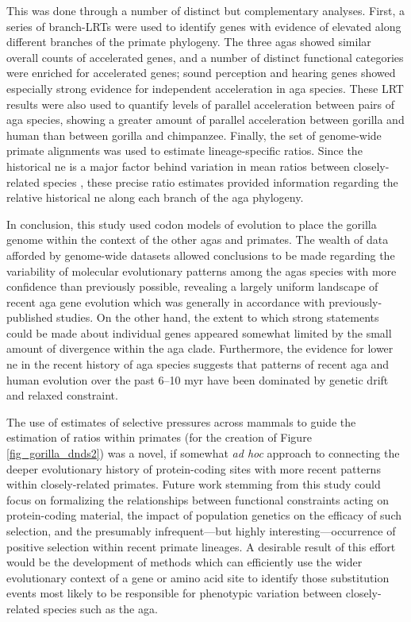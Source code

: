 This was done through a number of distinct but complementary
analyses. First, a series of branch-LRTs were used to identify genes
with evidence of elevated \dnds along different branches of the
primate phylogeny. The three \acp{aga} showed similar overall counts
of accelerated genes, and a number of distinct functional categories
were enriched for accelerated genes; sound perception and hearing
genes showed especially strong evidence for independent acceleration
in \ac{aga} species. These LRT results were also used to quantify
levels of parallel acceleration between pairs of \ac{aga} species,
showing a greater amount of parallel acceleration between gorilla and
human than between gorilla and chimpanzee. Finally, the set of
genome-wide primate alignments was used to estimate lineage-specific
\dnds ratios. Since the historical \acf{ne} is a major factor behind
variation in mean \dnds ratios between closely-related species
\citep{Kosiol2008,Ellegren2009}, these precise \dnds ratio estimates
provided information regarding the relative historical \ac{ne} along
each branch of the \ac{aga} phylogeny.

In conclusion, this study used codon models of evolution to place the
gorilla genome within the context of the other \acp{aga} and
primates. The wealth of data afforded by genome-wide datasets allowed
conclusions to be made regarding the variability of molecular
evolutionary patterns among the \acp{aga} species with more confidence
than previously possible, revealing a largely uniform landscape of
recent \ac{aga} gene evolution which was generally in accordance with
previously-published studies. On the other hand, the extent to which
strong statements could be made about individual genes appeared
somewhat limited by the small amount of divergence within the \ac{aga}
clade. Furthermore, the evidence for lower \ac{ne} in the recent
history of \ac{aga} species suggests that patterns of recent \ac{aga}
and human evolution over the past 6--10 \ac{myr} have been dominated
by genetic drift and relaxed constraint.

The use of \sw estimates of selective pressures across mammals to
guide the estimation of \dnds ratios within primates (for the creation
of Figure \ref{fig_gorilla_dnds2}) was a novel, if somewhat \emph{ad
  hoc} approach to connecting the deeper evolutionary history of
protein-coding sites with more recent patterns within closely-related
primates. Future work stemming from this study could focus on
formalizing the relationships between functional constraints acting on
protein-coding material, the impact of population genetics on the
efficacy of such selection, and the presumably infrequent---but highly
interesting---occurrence of positive selection within recent primate
lineages. A desirable result of this effort would be the development
of methods which can efficiently use the wider evolutionary context of
a gene or amino acid site to identify those substitution events most
likely to be responsible for phenotypic variation between
closely-related species such as the \ac{aga}.

